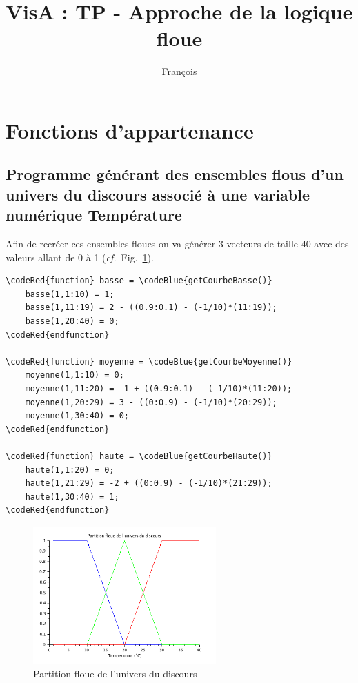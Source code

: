 \documentclass[a4paper,10pt]{article}
\title{VisA : TP - Approche de la logique floue}
\author{Fran\c cois \bsc{Lepan}}
\begin{document}
\maketitle

\section{Fonctions d'appartenance}

\subsection{Programme g\'en\'erant des ensembles flous d'un univers du discours associ\'e \`a une variable num\'erique Temp\'erature}
Afin de recr\'eer ces ensembles floues on va g\'en\'erer 3 vecteurs de taille 40 avec des valeurs allant de 0 \`a 1 (\emph{cf.}~Fig.~\ref{univers}).

\begin{Verbatim}[commandchars=\\\{\}]
\codeRed{function} basse = \codeBlue{getCourbeBasse()}
    basse(1,1:10) = 1;
    basse(1,11:19) = 2 - ((0.9:0.1) - (-1/10)*(11:19));
    basse(1,20:40) = 0;
\codeRed{endfunction}

\codeRed{function} moyenne = \codeBlue{getCourbeMoyenne()}
    moyenne(1,1:10) = 0;
    moyenne(1,11:20) = -1 + ((0.9:0.1) - (-1/10)*(11:20));
    moyenne(1,20:29) = 3 - ((0:0.9) - (-1/10)*(20:29));
    moyenne(1,30:40) = 0;
\codeRed{endfunction}

\codeRed{function} haute = \codeBlue{getCourbeHaute()}
    haute(1,1:20) = 0;
    haute(1,21:29) = -2 + ((0:0.9) - (-1/10)*(21:29));
    haute(1,30:40) = 1;
\codeRed{endfunction}
\end{Verbatim}

\begin{figure}[ht]
\begin{center}
	\includegraphics[width=7cm]{images/univers.png}
\end{center}
	\caption{Partition floue de l'univers du discours}
	\label{univers}
\end{figure}
\end{document}
